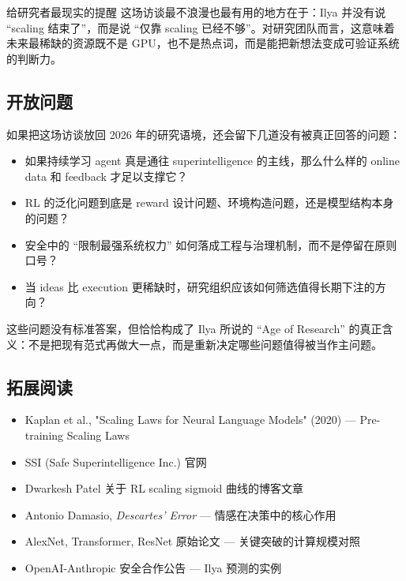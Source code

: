 \begin{importantbox}{给研究者最现实的提醒}
这场访谈最不浪漫也最有用的地方在于：Ilya 并没有说 ``scaling 结束了''，而是说 ``仅靠 scaling 已经不够''。对研究团队而言，这意味着未来最稀缺的资源既不是 GPU，也不是热点词，而是能把新想法变成可验证系统的判断力。
\end{importantbox}

\subsection{开放问题}

如果把这场访谈放回 2026 年的研究语境，还会留下几道没有被真正回答的问题：
\begin{itemize}
    \item 如果持续学习 agent 真是通往 superintelligence 的主线，那么什么样的 online data 和 feedback 才足以支撑它？
    \item RL 的泛化问题到底是 reward 设计问题、环境构造问题，还是模型结构本身的问题？
    \item 安全中的 ``限制最强系统权力'' 如何落成工程与治理机制，而不是停留在原则口号？
    \item 当 ideas 比 execution 更稀缺时，研究组织应该如何筛选值得长期下注的方向？
\end{itemize}

这些问题没有标准答案，但恰恰构成了 Ilya 所说的 ``Age of Research'' 的真正含义：不是把现有范式再做大一点，而是重新决定哪些问题值得被当作主问题。

\subsection{拓展阅读}

\begin{itemize}
    \item Kaplan et al., "Scaling Laws for Neural Language Models" (2020) --- Pre-training Scaling Laws
    \item SSI (Safe Superintelligence Inc.) 官网
    \item Dwarkesh Patel 关于 RL scaling sigmoid 曲线的博客文章
    \item Antonio Damasio, \textit{Descartes' Error} --- 情感在决策中的核心作用
    \item AlexNet, Transformer, ResNet 原始论文 --- 关键突破的计算规模对照
    \item OpenAI-Anthropic 安全合作公告 --- Ilya 预测的实例
\end{itemize}



